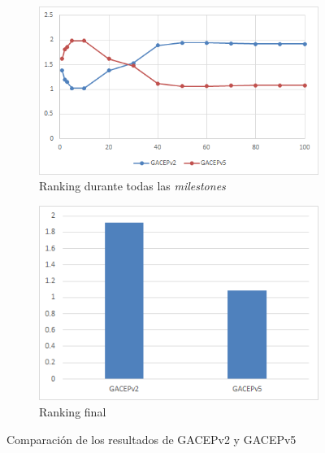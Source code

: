 \begin{figure}[h]
     \centering
     \begin{subfigure}[b]{0.45\textwidth}
         \centering
         \includegraphics[width=\textwidth]{imagenes/Experimental/GACEPv2vsGACEPv5.png}
         \caption{Ranking durante todas las \textit{milestones}}
         \label{fig:GACEPv2vsGACEPv5_lineas}
     \end{subfigure}
     \hfill
     \begin{subfigure}[b]{0.45\textwidth}
         \centering
         \includegraphics[width=\textwidth]{imagenes/Experimental/barras/GACEPv2vsGACEPv5.png}
         \caption{Ranking final}
         \label{fig:GACEPv2vsGACEPv5_barras}
     \end{subfigure}
        \caption{Comparación de los resultados de GACEPv2 y GACEPv5}
        \label{fig:GACEPv2vsGACEPv5}
\end{figure}


